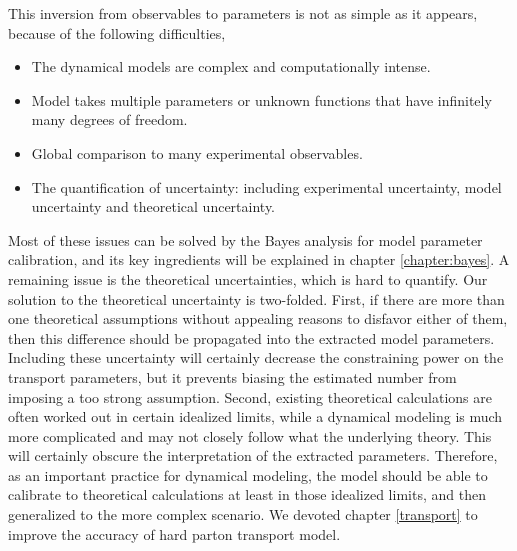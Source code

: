 This inversion from observables to parameters is not as simple as it appears, because of the following difficulties,
\begin{itemize}
\item The dynamical models are complex and computationally intense.
\item Model takes multiple parameters or unknown functions that have infinitely many degrees of freedom.
\item Global comparison to many experimental observables.
\item The quantification of uncertainty: including experimental uncertainty, model uncertainty and theoretical uncertainty.
\end{itemize}
Most of these issues can be solved by the Bayes analysis for model parameter calibration, and its key ingredients will be explained in chapter \ref{chapter:bayes}.
A remaining issue is the theoretical uncertainties, which is hard to quantify.
Our solution to the theoretical uncertainty is two-folded.
First, if there are more than one theoretical assumptions without appealing reasons to disfavor either of them, then this difference should be propagated into the extracted model parameters.
Including these uncertainty will certainly decrease the constraining power on the transport parameters, but it prevents biasing the estimated number from imposing a too strong assumption.
Second, existing theoretical calculations are often worked out in certain idealized limits, while a dynamical modeling is much more complicated and may not closely follow what the underlying theory.
This will certainly obscure the interpretation of the extracted parameters.
Therefore, as an important practice for dynamical modeling, the model should be able to calibrate to theoretical calculations at least in those idealized limits, and then generalized to the more complex scenario.
We devoted chapter \ref{transport} to improve the accuracy of hard parton transport model.

